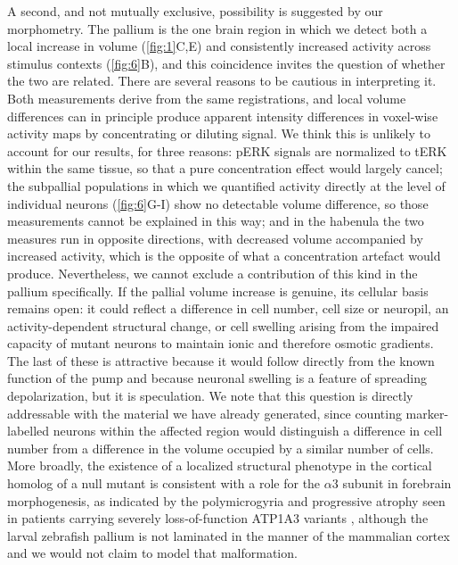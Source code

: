 \documentclass[9.5pt,lineno]{RandlettLab_elife}
\begin{document}
A second, and not mutually exclusive, possibility is suggested by our morphometry.
The pallium is the one brain region in which we detect both a local increase in volume (\autoref{fig:1}C,E) and consistently increased activity across stimulus contexts (\autoref{fig:6}B), and this coincidence invites the question of whether the two are related.
There are several reasons to be cautious in interpreting it.
Both measurements derive from the same registrations, and local volume differences can in principle produce apparent intensity differences in voxel-wise activity maps by concentrating or diluting signal.
We think this is unlikely to account for our results, for three reasons: pERK signals are normalized to tERK within the same tissue, so that a pure concentration effect would largely cancel; the subpallial populations in which we quantified activity directly at the level of individual neurons (\autoref{fig:6}G-I) show no detectable volume difference, so those measurements cannot be explained in this way; and in the habenula the two measures run in opposite directions, with decreased volume accompanied by increased activity, which is the opposite of what a concentration artefact would produce.
Nevertheless, we cannot exclude a contribution of this kind in the pallium specifically.
If the pallial volume increase is genuine, its cellular basis remains open: it could reflect a difference in cell number, cell size or neuropil, an activity-dependent structural change, or cell swelling arising from the impaired capacity of mutant neurons to maintain ionic and therefore osmotic gradients.
The last of these is attractive because it would follow directly from the known function of the pump and because neuronal swelling is a feature of spreading depolarization, but it is speculation.
We note that this question is directly addressable with the material we have already generated, since counting marker-labelled neurons within the affected region would distinguish a difference in cell number from a difference in the volume occupied by a similar number of cells.
More broadly, the existence of a localized structural phenotype in the cortical homolog of a null mutant is consistent with a role for the $\alpha$3 subunit in forebrain morphogenesis, as indicated by the polymicrogyria and progressive atrophy seen in patients carrying severely loss-of-function ATP1A3 variants \citep{Vetro2021, Smith2021}, although the larval zebrafish pallium is not laminated in the manner of the mammalian cortex and we would not claim to model that malformation.
\end{document}

